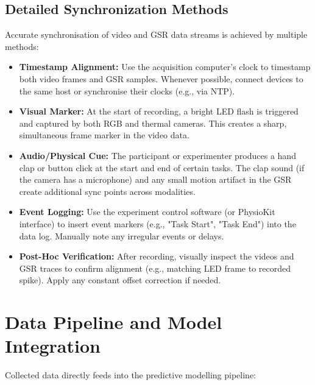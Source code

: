 \documentclass{article}
\begin{document}
\subsection{Detailed Synchronization Methods}

Accurate synchronisation of video and GSR data streams is achieved by multiple methods:

\begin{itemize}
    \item \textbf{Timestamp Alignment:} Use the acquisition computer's clock to timestamp both video frames and GSR samples. Whenever possible, connect devices to the same host or synchronise their clocks (e.g., via NTP).
    \item \textbf{Visual Marker:} At the start of recording, a bright LED flash is triggered and captured by both RGB and thermal cameras. This creates a sharp, simultaneous frame marker in the video data.
    \item \textbf{Audio/Physical Cue:} The participant or experimenter produces a hand clap or button click at the start and end of certain tasks. The clap sound (if the camera has a microphone) and any small motion artifact in the GSR create additional sync points across modalities.
    \item \textbf{Event Logging:} Use the experiment control software (or PhysioKit interface) to insert event markers (e.g., "Task Start", "Task End") into the data log. Manually note any irregular events or delays.
    \item \textbf{Post-Hoc Verification:} After recording, visually inspect the videos and GSR traces to confirm alignment (e.g., matching LED frame to recorded spike). Apply any constant offset correction if needed.
\end{itemize}

\section{Data Pipeline and Model Integration}

Collected data directly feeds into the predictive modelling pipeline:
\end{document}
